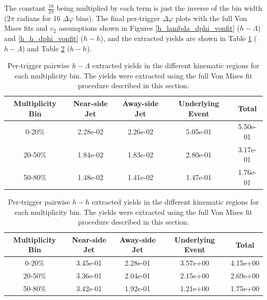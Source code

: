 \documentclass[ALICE,manyauthors]{ALICE_analysis_notes}
\begin{document}
The constant $\frac{16}{2\pi}$ being multiplied by each term is just the inverse of the bin width ($2\pi$ radians for 16 $\Delta\varphi$ bins).
The final per-trigger $\Delta\varphi$ plots with the full Von Mises fits and $v_{2}$ assumptions shown in Figures \ref{h_lambda_dphi_vonfit} ($h-\Lambda$) and \ref{h_h_dphi_vonfit} ($h-h$), and the extracted yields are shown in Table \ref{h_lambda_yield_table_vonfit} ($h-\Lambda$) and Table \ref{h_h_yield_table_vonfit} ($h-h$). 

\begin{table}[h!]
\centering
\begin{tabular}{| c | c | c | c | c | }
\hline
Multiplicity Bin & Near-side Jet & Away-side Jet & Underlying Event & Total  \\
\hline
	
0-20\% & 2.28e-02  & 2.26e-02  & 5.05e-01 & 5.50e-01 \\
20-50\% & 1.84e-02 & 1.83e-02  & 2.80e-01 & 3.17e-01 \\
50-80\% & 1.48e-02 & 1.41e-02  & 1.47e-01 & 1.76e-01 \\
	
\hline
\end{tabular}
\caption{Per-trigger pairwise $h-\Lambda$ extracted yields in the different kinematic regions for each multiplicity bin. The yields were extracted using the full Von Mises fit procedure described in this section.}
\label{h_lambda_yield_table_vonfit}
\end{table}
	
\begin{table}[h!]
\centering
\begin{tabular}{| c | c | c | c | c | }
\hline
Multiplicity Bin & Near-side Jet & Away-side Jet & Underlying Event & Total  \\
\hline

0-20\% & 3.45e-01  & 2.28e-01  & 3.57e+00 & 4.15e+00 \\
20-50\% & 3.36e-01 & 2.04e-01  & 2.15e+00 & 2.69e+00 \\
50-80\% & 3.42e-01 & 1.92e-01  & 1.21e+00 & 1.75e+00 \\

\hline
\end{tabular}
\caption{Per-trigger pairwise $h-h$ extracted yields in the different kinematic regions for each multiplicity bin. The yields were extracted using the full Von Mises fit procedure described in this section.}
\label{h_h_yield_table_vonfit}
\end{table}
\end{document}
